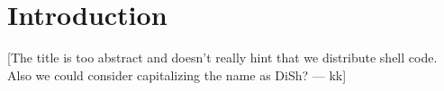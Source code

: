 \documentclass[sigplan,10pt,review,anonymous]{acmart}
\newcommand{\kk}[1]{[{\color{magenta}#1 --- kk}]}
\begin{document}




\maketitle


\section{Introduction}
\label{intro}

\kk{The title is too abstract and doesn't really hint that we
  distribute shell code. Also we could consider capitalizing the name
  as DiSh?}

% 
\end{document}
